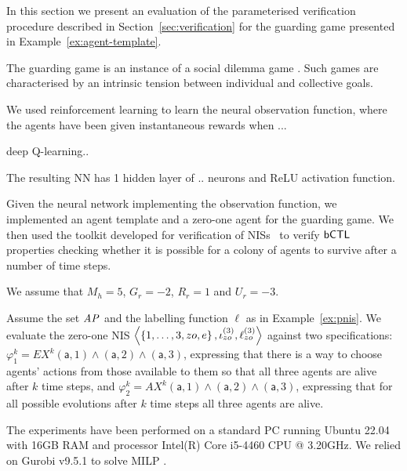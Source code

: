 
In this section we present an evaluation of the parameterised verification
procedure described in Section~\ref{sec:verification} for the guarding game
presented in Example~\ref{ex:agent-template}.


The guarding game is an instance of a social dilemma game
\cite{LeiboZLMG17}. Such games are characterised by an intrinsic tension
between individual and collective goals.

We used reinforcement learning to learn the neural observation function, where
the agents have been given instantaneous rewards when ...

deep Q-learning..

The resulting NN has 1 hidden layer of .. neurons and ReLU activation function.



Given the neural network implementing the observation function, we 
implemented an agent template and a zero-one agent for the guarding game. We
then used the \venmas toolkit developed for verification of
NISs~\cite{Akintunde+20b} to verify $\sf{bCTL}$ properties checking whether it is
possible for a colony of agents to survive after a number of time steps.

We assume that $M_h = 5$, $G_r = -2$, $R_r = 1$ and $U_r = -3$. 

Assume the set $\it{AP}$ and the labelling function $\ell$ as in
Example~\ref{ex:pnis}. We evaluate the zero-one NIS
$\left \langle \left \{ 1,\ldots,3,zo,e \right \}, \iota^{({3})}_{zo}, \ell^{(3)}_{zo} \right \rangle$
against two specifications:
$\varphi^k_1 = EX^k (\mathsf{a},1) \land (\mathsf{a},2) \land (\mathsf{a},3)$,
expressing that there is a way to choose agents' actions from those available
to them so that all three agents are alive after $k$ time steps, and
$\varphi^k_2 = AX^k (\mathsf{a},1) \land (\mathsf{a},2) \land (\mathsf{a},3)$,
expressing that for all possible evolutions after $k$ time steps all three
agents are alive.

The experiments have been performed on a standard PC running Ubuntu 22.04 with
16GB RAM and processor Intel(R) Core i5-4460 CPU @ 3.20GHz. We relied on Gurobi
v9.5.1 to solve MILP \cite{Gurobi+16a}.


